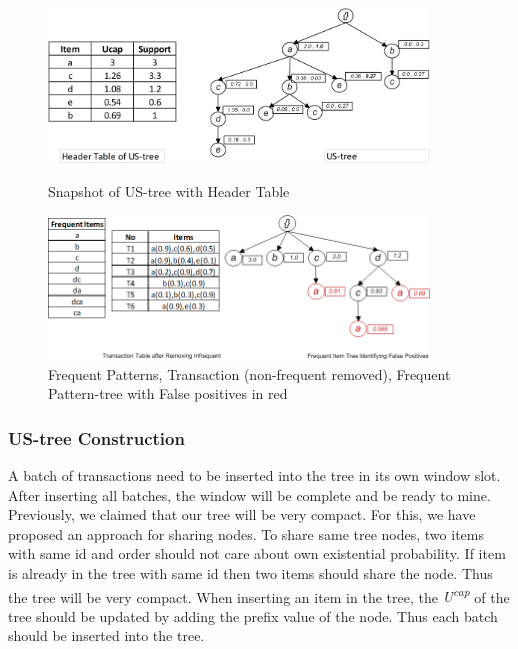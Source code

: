 \documentclass[conference]{IEEEtran}
\begin{document}
\begin{figure}[t]
    \begin{minipage}{0.5\linewidth}
    \centering
	\includegraphics[width=0.9\textwidth]{visio/us_tree}  
	\caption{Snapshot of US-tree with Header Table}%
	\label{figure:US_TREE_HEADER_TABLE}
    \end{minipage}%
    \begin{minipage}{0.5\linewidth}
    \centering
%	
%	
		\includegraphics[width=0.9\textwidth]{visio/frequent_tree_final_ex}  
	\caption{Frequent Patterns, Transaction (non-frequent removed), Frequent Pattern-tree with False positives in red}%
	\label{figure:FALSE_NEGATIVE}
    \end{minipage}
\end{figure}
%

\subsubsection{US-tree Construction}
A batch of transactions need to be inserted into the tree in its own window slot. After inserting all batches, the window will be complete and be ready to mine. Previously, we claimed that our tree will be very compact. For this, we have proposed an approach for sharing nodes. To share same tree nodes, two items with same id and order should not care about own existential probability. If item is already in the tree with same id then two items should share the node. Thus the tree will be very compact. When inserting an item in the tree, the \emph{U\textsuperscript{cap}} of the tree should be updated by adding the prefix value of the node. Thus each batch should be inserted into the tree.
\end{document}
